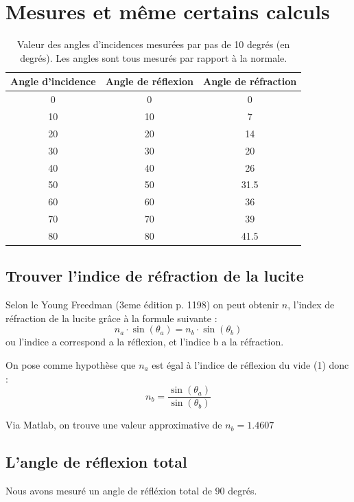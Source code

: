\documentclass[a4paper,11pt]{article}
\begin{document}
\clearpage
{}
\newpage

\thispagestyle{empty}



\section{Mesures et même certains calculs} 
\begin{table}[!h]
	\begin{center}
	\begin{tabular}{|c|c|c|}
	\hline
		Angle d'incidence & Angle de réflexion & Angle de réfraction \\
	\hline
		0 & 0 & 0 \\
		10 & 10 & 7 \\
		20 & 20 & 14 \\
		30 & 30 & 20 \\
		40 & 40 & 26 \\
		50 & 50 & 31.5 \\
		60 & 60 & 36 \\
		70 & 70 & 39 \\
		80 & 80 & 41.5 \\
	\hline
	\end{tabular}
	\end{center}
	\caption{Valeur des angles d'incidences mesurées par pas de 10 degrés (en degrés). Les angles sont tous mesurés par rapport à la normale.}
\end{table}
\subsection{Trouver l'indice de réfraction de la lucite}

Selon le Young Freedman (3eme édition p. 1198) on peut obtenir $n$, l'index de réfraction de la lucite grâce à la formule suivante : 
$$ n_a \cdot \sin (\theta_a) = n_b \cdot \sin (\theta_b)$$
ou l'indice a correspond a la réflexion, et l'indice b a la réfraction.

On pose comme hypothèse que $n_a$ est égal à l'indice de réflexion du vide (1) donc :
$$ n_b = \frac{\sin (\theta_a)}{\sin (\theta_b)} $$

Via Matlab, on trouve une valeur approximative de $n_b = 1.4607$

\subsection{L'angle de réflexion total}
Nous avons mesuré un angle de réfléxion total de $90$ degrés.
\end{document}
